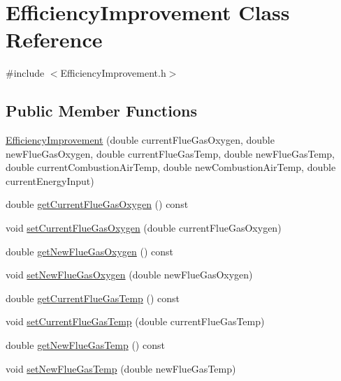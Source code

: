 \hypertarget{class_efficiency_improvement}{}\section{Efficiency\+Improvement Class Reference}
\label{class_efficiency_improvement}


{\ttfamily \#include $<$Efficiency\+Improvement.\+h$>$}

\subsection*{Public Member Functions}
\begin{DoxyCompactItemize}
\item 
\hyperlink{class_efficiency_improvement_a84e4463e307cd280360a4dfbbb369c55}{Efficiency\+Improvement} (double current\+Flue\+Gas\+Oxygen, double new\+Flue\+Gas\+Oxygen, double current\+Flue\+Gas\+Temp, double new\+Flue\+Gas\+Temp, double current\+Combustion\+Air\+Temp, double new\+Combustion\+Air\+Temp, double current\+Energy\+Input)
\item 
double \hyperlink{class_efficiency_improvement_a8b66a676d696f7a9fcc8fa987371d80b}{get\+Current\+Flue\+Gas\+Oxygen} () const
\item 
void \hyperlink{class_efficiency_improvement_a038c378d51a5baf96521012a572bb106}{set\+Current\+Flue\+Gas\+Oxygen} (double current\+Flue\+Gas\+Oxygen)
\item 
double \hyperlink{class_efficiency_improvement_a46dbfa28b53f36de80dd730c07b294f1}{get\+New\+Flue\+Gas\+Oxygen} () const
\item 
void \hyperlink{class_efficiency_improvement_a111f7e30d302b4e71103a2ec6d199e2c}{set\+New\+Flue\+Gas\+Oxygen} (double new\+Flue\+Gas\+Oxygen)
\item 
double \hyperlink{class_efficiency_improvement_a27e97b5c7aad8aa6b4d02e18354d2292}{get\+Current\+Flue\+Gas\+Temp} () const
\item 
void \hyperlink{class_efficiency_improvement_aef6ffeae5135982ef223ce4a5efe23d8}{set\+Current\+Flue\+Gas\+Temp} (double current\+Flue\+Gas\+Temp)
\item 
double \hyperlink{class_efficiency_improvement_a4de84ef27e3b4c518319fea77d039845}{get\+New\+Flue\+Gas\+Temp} () const
\item 
void \hyperlink{class_efficiency_improvement_ab88d3976fca8f55bb1fd3278bc427fc1}{set\+New\+Flue\+Gas\+Temp} (double new\+Flue\+Gas\+Temp)
\item 

\end{DoxyCompactItemize}
